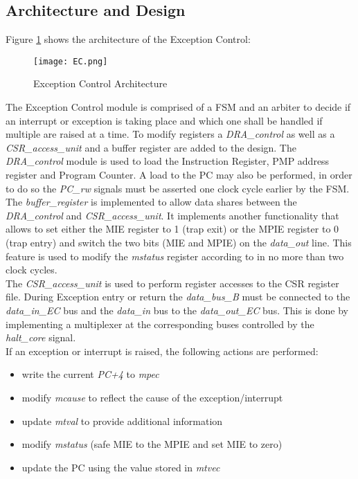 \subsection{Architecture and Design}
Figure \ref{fig:EC} shows the architecture of the Exception Control:
\begin{figure}[H]
	\centering
	\texttt{[image: EC.png]}
	\caption{Exception Control Architecture}
	\label{fig:EC}
\end{figure}
The Exception Control module is comprised of a \ac{FSM} and an arbiter to decide if an
interrupt or exception is taking place and which one shall be handled if multiple are raised at a time. To modify registers a \textit{DRA\_control} as well as a \textit{CSR\_access\_unit} and a buffer register are added to the design. 
The \textit{DRA\_control} module is used to load the Instruction Register, PMP address register and Program Counter. A load to the PC may also be performed, in order to do so the \textit{PC\_rw} signals must be asserted one clock cycle earlier by the FSM.\\
The \textit{buffer\_register} is implemented to allow data shares between the \textit{DRA\_control} and \textit{CSR\_access\_unit}. It implements another functionality that allows to set either the \ac{MIE} register to 1 (trap exit) or the \ac{MPIE} register to 0 (trap entry) and switch the two bits (\ac{MIE} and \ac{MPIE}) on the \textit{data\_out} line. This feature is used to modify the \textit{mstatus} register according to \cite{riscv:privileged} in no more than two clock cycles.\\
The \textit{CSR\_access\_unit} is used to perform register accesses to the \ac{CSR} register file. During Exception entry or return the \textit{data\_bus\_B} must be connected to the
\textit{data\_in\_EC} bus and the \textit{data\_in} bus to the \textit{data\_out\_EC} bus. This is done by implementing a multiplexer at the corresponding buses controlled by the\textit{ halt\_core} signal.\\
If an exception or interrupt is raised, the following actions are performed:
\begin{itemize}
	\item write the current \textit{PC+4} to \textit{mpec}
	\item modify \textit{mcause} to reflect the cause of the exception/interrupt
	\item update \textit{mtval} to provide additional information
	\item modify \textit{mstatus} (safe \ac{MIE} to the \ac{MPIE} and set \ac{MIE} to zero)
	\item update the \ac{PC} using the value stored in \textit{mtvec}
\end{itemize}
